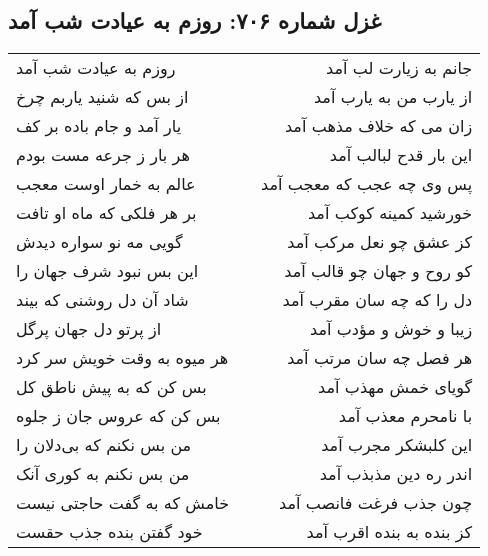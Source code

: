 \begin{center}
\section*{غزل شماره ۷۰۶: روزم به عیادت شب آمد}
\label{sec:0706}
\begin{longtable}{l p{0.5cm} r}
روزم به عیادت شب آمد
&&
جانم به زیارت لب آمد
\\
از بس که شنید یاربم چرخ
&&
از یارب من به یارب آمد
\\
یار آمد و جام باده بر کف
&&
زان می که خلاف مذهب آمد
\\
هر بار ز جرعه مست بودم
&&
این بار قدح لبالب آمد
\\
عالم به خمار اوست معجب
&&
پس وی چه عجب که معجب آمد
\\
بر هر فلکی که ماه او تافت
&&
خورشید کمینه کوکب آمد
\\
گویی مه نو سواره دیدش
&&
کز عشق چو نعل مرکب آمد
\\
این بس نبود شرف جهان را
&&
کو روح و جهان چو قالب آمد
\\
شاد آن دل روشنی که بیند
&&
دل را که چه سان مقرب آمد
\\
از پرتو دل جهان پرگل
&&
زیبا و خوش و مؤدب آمد
\\
هر میوه به وقت خویش سر کرد
&&
هر فصل چه سان مرتب آمد
\\
بس کن که به پیش ناطق کل
&&
گویای خمش مهذب آمد
\\
بس کن که عروس جان ز جلوه
&&
با نامحرم معذب آمد
\\
من بس نکنم که بی‌دلان را
&&
این کلبشکر مجرب آمد
\\
من بس نکنم به کوری آنک
&&
اندر ره دین مذبذب آمد
\\
خامش که به گفت حاجتی نیست
&&
چون جذب فرغت فانصب آمد
\\
خود گفتن بنده جذب حقست
&&
کز بنده به بنده اقرب آمد
\\
\end{longtable}
\end{center}
